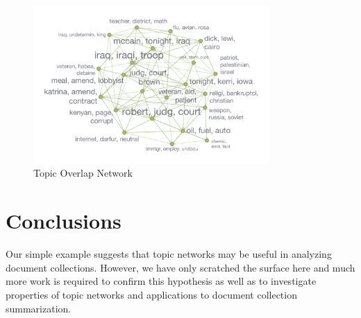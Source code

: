 \documentclass[%
	final,
	notitlepage,
	narroweqnarray,
	inline,
	]{ieee}
\begin{document}
\begin{figure}
\centering
\includegraphics[width=90mm]{overlap-network.pdf}
\caption{Topic Overlap Network}
\label{fig:overlap-network}
\end{figure}



\section{Conclusions}

\PARstart Our simple example suggests that topic networks may be useful in analyzing 
document collections.  However, we have only scratched the surface
here and much more work is required to confirm this hypothesis as well as to investigate
properties of topic networks and applications to document collection summarization.
\end{document}
